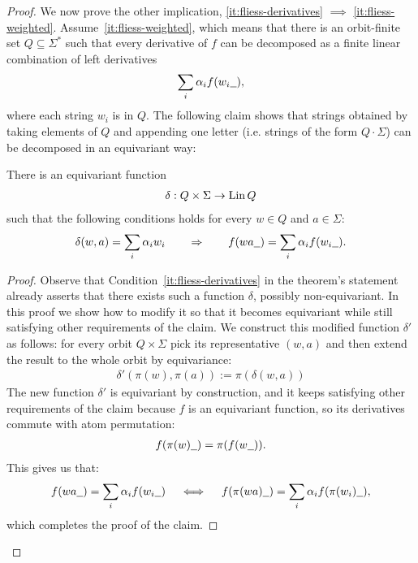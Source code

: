 \begin{proof}
    We now prove the other implication, \ref{it:fliess-derivatives} $\implies$ \ref{it:fliess-weighted}. Assume~\ref{it:fliess-weighted}, which means that   there is an orbit-finite set $Q \subseteq \Sigma^*$ such that every derivative of $f$ can be decomposed as a finite linear combination of left derivatives
    \begin{align*}
            \sum_i \alpha_i f(w_i\underline{\hspace{2mm}}),
    \end{align*}
    where each string $w_i$ is in $Q$. The following claim shows that strings obtained by taking elements of $Q$ and appending one letter
    (i.e. strings of the form $Q \cdot \Sigma$) can be decomposed in an equivariant way:
    \begin{claim}
            There is an equivariant function 
        \begin{align*}
       \delta :  Q \times \Sigma \to \operatorname{Lin} Q
        \end{align*}
        such that the following conditions holds for every $w \in Q$ and $a \in \Sigma$:
        \begin{align*}
        \delta(w,a) = 
        \sum_i \alpha_i w_i 
        \qquad \Rightarrow \qquad 
        f(wa\underline{\hspace{2mm}}) = \sum_i \alpha_i f(w_i\underline{\hspace{2mm}}).
        \end{align*}
    \end{claim}
    \begin{proof}
        Observe that Condition~\ref{it:fliess-derivatives} in the theorem's statement already asserts that there exists such a function $\delta$,
        possibly non-equivariant. In this proof we show how to modify it so that it becomes equivariant
        while still satisfying other requirements of the claim. We construct this modified function $\delta'$ as follows:
        for every orbit $Q \times \Sigma$ pick its representative $(w, a)$ and then extend the result to the whole orbit by equivariance:
        \begin{align*}
        \delta'(\pi(w), \pi(a)) := \pi(\delta(w, a))
        \end{align*}
        The new function $\delta'$ is equivariant by construction, and it keeps satisfying other requirements of the claim because
        $f$ is an equivariant function, so its derivatives commute with atom permutation:
        \begin{align*}
        f(\pi(w)\underline{\hspace{2mm}})= \pi(f(w\underline{\hspace{2mm}})).
        \end{align*}
        This gives  us that:
        \begin{align*}
                    f(wa\underline{\hspace{2mm}}) = \sum_i \alpha_i f(w_i\underline{\hspace{2mm}})
                    \quad \iff \quad 
                            f(\pi(wa)\underline{\hspace{2mm}}) = \sum_i \alpha_i f(\pi(w_i)\underline{\hspace{2mm}}),
        \end{align*}
        which completes the proof of the claim.
    \end{proof}        


\end{proof}
